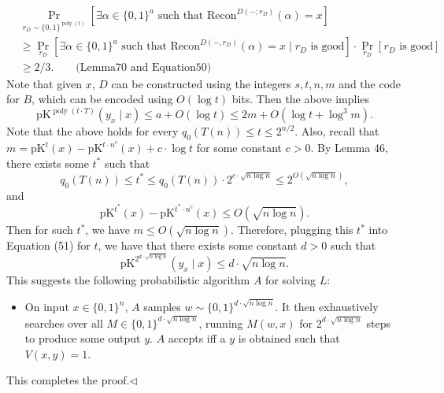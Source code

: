 \documentclass[10pt,a4paper]{article}
\begin{document}
\begin{align*}
&\Pr_{r_D\sim\{0,1\}^{\operatorname{poly}(t)}}[\exists\alpha\in\{0,1\}^a\text{ such that }\mathrm{Recon}^{D(-;r_D)}(\alpha)=x]\\
&\geq\Pr_{r_D}[\exists\alpha\in\{0,1\}^a\text{ such that }\mathrm{Recon}^{D(-,r_D)}(\alpha)=x\mid r_D\text{ is good}]\cdot\Pr_{r_D}[r_D\text{ is good}]\\
&\geq2/3.\qquad\text{(Lemma70 and Equation50)}
\end{align*}
Note that given $x$, $D$ can be constructed using the integers $s,t,n,m$ and the code for $B$, which can be encoded using $O(\log t)$ bits. Then the above implies
\[\mathrm{pK}^{\operatorname{poly}(t\cdot T)}(y_x\mid x)\leq a+O(\log t)\leq2m+O(\log t+\log^3m).\tag{51}\]
Note that the above holds for every $q_0(T(n))\leq t\leq2^{n/2}$. Also, recall that $m=\mathrm{pK}^t(x)-\mathrm{pK}^{t\cdot n^c}(x)+c\cdot\log t$ for some constant $c>0$. By Lemma 46, there exists some $t^*$ such that
\[q_0(T(n))\leq t^*\leq q_0(T(n))\cdot2^{c\cdot\sqrt{n\log n}}\leq2^{O(\sqrt{n\log n})},\]
and
\[\mathrm{pK}^{t^*}(x)-\mathrm{pK}^{t^*\cdot n^c}(x)\leq O(\sqrt{n\log n}).\]
Then for such $t^*$, we have $m\leq O(\sqrt{n\log n})$. Therefore, plugging this $t^*$ into Equation (51) for $t$, we have that there exists some constant $d>0$ such that
\[\mathrm{pK}^{2^{d\cdot\sqrt{n\log n}}}(y_x\mid x)\leq d\cdot\sqrt{n\log n}.\]
This suggests the following probabilistic algorithm $A$ for solving $L$:
\begin{itemize}
\item On input $x\in\{0,1\}^n$, $A$ samples $w\sim\{0,1\}^{d\cdot\sqrt{n\log n}}$. It then exhaustively searches over all $M\in\{0,1\}^{d\cdot\sqrt{n\log n}}$, running $M(w,x)$ for $2^{d\cdot\sqrt{n\log n}}$ steps to produce some output $y$. $A$ accepts iff a $y$ is obtained such that $V(x,y)=1$.
\end{itemize}
This completes the proof.\hfill$\triangleleft$
\end{document}
